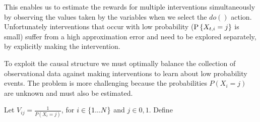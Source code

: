 This enables us to estimate the rewards for multiple interventions simultaneously by observing the values taken by the variables when we select the $do()$ action. Unfortunately interventions that occur with low probability ($\P{X_{t,i} = j}$ is small) suffer from a high approximation error and need to be explored separately, by explicitly making the intervention. 

To exploit the causal structure we must optimally balance the collection of observational data against making interventions to learn about low probability events. The problem is more challenging because the probabilities $P(X_i=j)$ are unknown and must also be estimated.

\begin{definition}
Let $V_{ij} = \frac{1}{P(X_i = j)}$, for $i \in \set{1...N}$ and $j \in {0,1}$. 
Define 
\end{definition}

\fi
